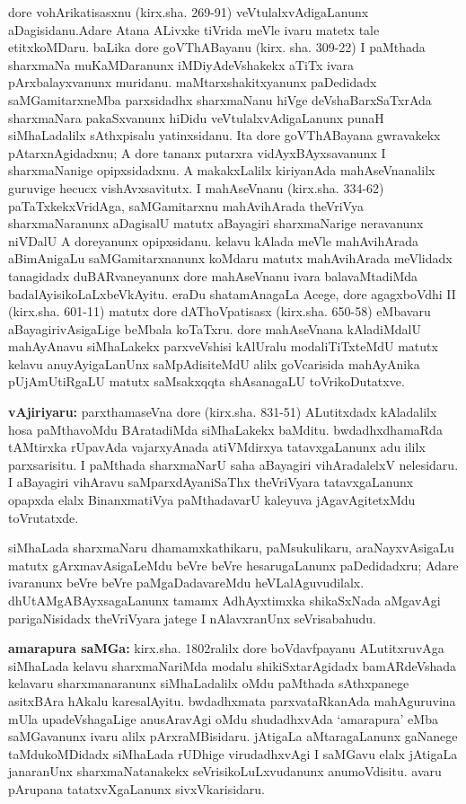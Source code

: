 dore vohArikatisasxnu (kirx.sha. 269-91) veVtulalxvAdigaLanunx aDagisidanu.\break Adare Atana ALivxke tiVrida meVle ivaru matetx tale etitxkoMDaru. baLika dore goVThA\-Bayanu (kirx. sha. 309-22) I paMthada sharxmaNa muKaMDaranunx iMDiyAdeVshakekx aTiTx ivara pArxbalayxvanunx muridanu. maMtarxshakitxyanunx paDedidadx saMGamitarxneMba parxsidadhx sharxmaNanu hiVge deVshaBarxSaTxrAda sharxmaNara pakaSxvanunx hiDidu veVtulalxvAdigaLanunx punaH siMhaLadalilx sAthxpisalu yatinxsidanu. Ita dore goVThABayana gwravakekx  pAtarxnAgidadxnu; A dore tananx putarxra vidAyxBAyxsavanunx I sharxmaNanige opipxsidadxnu. A makakxLalilx kiriyanAda mahAseVnanalilx guruvige hecucx vishAvxsavitutx. I mahAseVnanu (kirx.sha. 334-62) paTaTxkekxVridAga, saMGamitarxnu mahAvihArada theVriVya sharxmaNaranunx aDagisalU matutx aBayagiri sharxmaNarige neravanunx niVDalU A doreyanunx opipxsidanu. kelavu kAlada meVle mahAvihArada aBimAnigaLu saMGamitarxnanunx koMdaru matutx mahAvihArada meVlidadx tanagidadx duBARvaneyanunx dore mahAseVnanu ivara balavaMtadiMda badalAyisikoLaLxbeVkAyitu. eraDu shatamAnagaLa Acege, dore agagxboVdhi {\rm II} (kirx.sha. 601-11) matutx dore dAThoVpatisasx (kirx.sha. 650-58) eMbavaru aBayagirivAsigaLige beMbala koTaTxru. dore mahAseVnana kAladiMdalU mahAyAnavu siMhaLakekx parxveVshisi kAlUralu modaliTiTxteMdU matutx kelavu anuyAyigaLanUnx saMpAdisiteMdU alilx goVcarisida mahAyAnika pUjAmUtiRgaLU matutx saMsakxqqta shAsanagaLU toVrikoDutatxve.

{\bf vAjiriyaru:} parxthamaseVna dore (kirx.sha. 831-51) ALutitxdadx kAladalilx hosa paMthavoMdu BAratadiMda siMhaLakekx baMditu. bwdadhxdhamaRda tAMtirxka rUpavAda vajarxyAnada atiVMdirxya tatavxgaLanunx adu ililx parxsarisitu. I paMthada sharxmaNarU saha aBayagiri vihAradalelxV nelesidaru. I aBayagiri vihAravu saMparxdAyaniSaThx theVriVyara tatavxgaLanunx opapxda elalx BinanxmatiVya paMthadavarU kaleyuva jAgavAgitetxMdu toVrutatxde. 

siMhaLada sharxmaNaru dhamamxkathikaru, paMsukulikaru, araNayxvAsigaLu matutx gArxmavAsigaLeMdu beVre beVre hesarugaLanunx paDedidadxru; Adare ivaranunx beVre beVre paMgaDadavareMdu heVLalAguvudilalx. dhUtAMgABAyxsagaLanunx tamamx AdhAyxtimxka shikaSxNada aMgavAgi parigaNisidadx theVriVyara jatege I nAlavxranUnx seVrisabahudu.

{\bf amarapura saMGa:} kirx.sha. 1802ralilx dore boVdavfpayanu ALutitxruvAga siMhaLada kelavu sharxmaNariMda modalu shikiSxtarAgidadx bamARdeVshada kelavaru sharxmanaranunx siMhaLadalilx oMdu paMthada sAthxpanege asitxBAra hAkalu karesalAyitu. bwdadhxmata parxvataRkanAda mahAguruvina mUla upadeVshagaLige  anusAravAgi oMdu shudadhxvAda `amarapura' eMba saMGavanunx ivaru alilx pArxraMBisidaru. jAtigaLa aMtaragaLanunx gaNanege taMdukoMDidadx siMhaLada rUDhige virudadhxvAgi I saMGavu elalx jAtigaLa janaranUnx sharxmaNatanakekx seVrisikoLuLxvudanunx anumoVdisitu. avaru pArupana tatatxvXgaLanunx sivxVkarisidaru.

